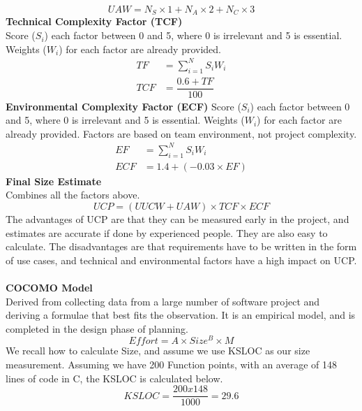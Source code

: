 \documentclass[a4paper,10pt]{article}
\begin{document}
\begin{equation*}
	UAW = N_{S} \times 1 + N_{A} \times 2 + N_{C} \times 3
\end{equation*}
\newpage
\noindent \textbf{Technical Complexity Factor (TCF)} \\
Score ($S_{i}$) each factor between 0 and 5, where 0 is irrelevant and 5 is essential. Weights ($W_{i}$) for each factor are already provided. 
\begin{align*}
	TF &= \sum_{i=1}^{N} S_{i} W_{i} \\
	TCF &= \dfrac{0.6 + TF}{100}
\end{align*}
\newline 
\newline 
\textbf{Environmental Complexity Factor (ECF)}
Score ($S_{i}$) each factor between 0 and 5, where 0 is irrelevant and 5 is essential. Weights ($W_{i}$) for each factor are already provided. Factors are based on team environment, not project complexity. 
\begin{align*}
	EF &= \sum_{i=1}^{N} S_{i} W_{i} \\
	ECF &= 1.4 + (-0.03 \times EF)
\end{align*}
\textbf{Final Size Estimate} \\
Combines all the factors above. 
\begin{equation*}
	UCP = (UUCW + UAW) \times TCF \times ECF
\end{equation*}
\newline
The advantages of UCP are that they can be measured early in the project, and estimates are accurate if done by experienced people. They are also easy to calculate. The disadvantages are that requirements have to be written in the form of use cases, and technical and environmental factors have a high impact on UCP. \\\\
\textcolor{BlueGreen}{\textbf{COCOMO Model}} \\
Derived from collecting data from a large number of software project and deriving a formulae that best fits the observation. It is an empirical model, and is completed in the design phase of planning. 
\begin{equation*}
	Effort = A \times Size^{B} \times M
\end{equation*}
We recall how to calculate Size, and assume we use KSLOC as our size measurement. Assuming we have 200 Function points, with an average of 148 lines of code in C, the KSLOC is calculated below. 
\begin{equation*}
	KSLOC = \dfrac{200 x 148}{1000} = 29.6
\end{equation*}
\end{document}
